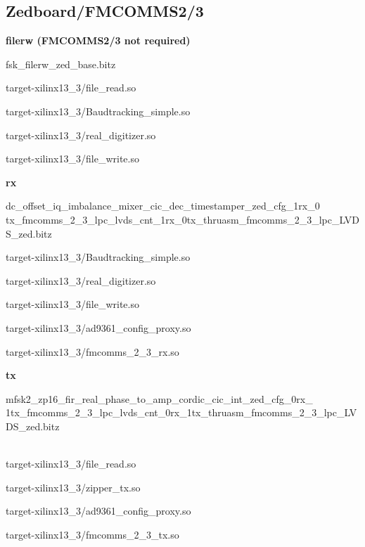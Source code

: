 \subsection{Zedboard/FMCOMMS2/3}
	\noindent\textbf{filerw (FMCOMMS2/3 not required)}
	\begin{itemize}
	\begin{minipage}[t]{.5\textwidth}
	\item fsk\_filerw\_zed\_base.bitz
	\item target-xilinx13\_3/file\_read.so
	\item target-xilinx13\_3/Baudtracking\_simple.so
	\end{minipage}
	\begin{minipage}[t]{.5\textwidth}
	\item target-xilinx13\_3/real\_digitizer.so
	\item target-xilinx13\_3/file\_write.so
	\end{minipage}
	\end{itemize}

	\noindent\textbf{rx}
	\begin{itemize}
  \item dc\_offset\_iq\_imbalance\_mixer\_cic\_dec\_timestamper\_zed\_cfg\_1rx\_0\\
tx\_fmcomms\_2\_3\_lpc\_lvds\_cnt\_1rx\_0tx\_thruasm\_fmcomms\_2\_3\_lpc\_LVDS\_zed.bitz \\
	\begin{minipage}[t]{.5\textwidth}
	\item target-xilinx13\_3/Baudtracking\_simple.so
	\item target-xilinx13\_3/real\_digitizer.so
	\item target-xilinx13\_3/file\_write.so
	\end{minipage}
	\begin{minipage}[t]{.5\textwidth}
	\item target-xilinx13\_3/ad9361\_config\_proxy.so
	\item target-xilinx13\_3/fmcomms\_2\_3\_rx.so
	\end{minipage}
	\end{itemize}

	\noindent\textbf{tx}
	\begin{itemize}
  \item mfsk2\_zp16\_fir\_real\_phase\_to\_amp\_cordic\_cic\_int\_zed\_cfg\_0rx\_\\
1tx\_fmcomms\_2\_3\_lpc\_lvds\_cnt\_0rx\_1tx\_thruasm\_fmcomms\_2\_3\_lpc\_LVDS\_zed.bitz
\\ \\
	\begin{minipage}[t]{.5\textwidth}
	\item target-xilinx13\_3/file\_read.so
	\item target-xilinx13\_3/zipper\_tx.so
	\end{minipage}
	\begin{minipage}[t]{.5\textwidth}
	\item target-xilinx13\_3/ad9361\_config\_proxy.so
	\item target-xilinx13\_3/fmcomms\_2\_3\_tx.so
	\end{minipage}
	\end{itemize}

